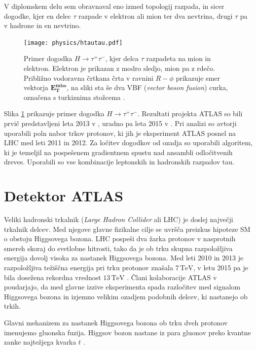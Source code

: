 \documentclass[11pt,a4paper,openany]{book}
\begin{document}
V diplomskem delu sem obravnaval eno izmed topologij razpada, in sicer dogodke, kjer en delec $\tau$ razpade v elektron ali mion ter dva nevtrina, drugi $\tau$ pa v hadrone in en nevtrino.

\begin{figure}[ht]
	\texttt{[image: physics/htautau.pdf]}
	
	\caption{Primer dogodka $H \rightarrow \tau^+\tau^-$, kjer delca $\tau$ razpadeta na mion in elektron. Elektron je prikazan z modro sledjo, mion pa z rdečo. Približno vodoravna črtkana črta v ravnini $R-\phi$ prikazuje smer vektorja $\mathbf{E_T^{miss}}$, na sliki sta še dva VBF (\textit{vector boson fusion}) curka, označena s turkiznima stožcema \cite{atlas2015htautau}.  }
	\label{htautau}
\end{figure}

Slika \ref{htautau} prikazuje primer dogodka $H \rightarrow \tau^+\tau^-$. Rezultati projekta ATLAS so bili prvič predstavljeni leta 2013 v \cite{atlas2013}, uradno pa leta 2015 v \cite{atlas2015htautau}. Pri analizi so avtorji uporabili poln nabor trkov protonov, ki jih je eksperiment ATLAS posnel na LHC med leti 2011 in 2012. Za ločitev dogodkov od ozadja so uporabili algoritem, ki je temeljil na pospešenem gradientnem spustu nad ansambli odločitvenih dreves. Uporabili so vse kombinacije leptonskih in hadronskih razpadov tau.

\section{Detektor ATLAS}
\label{sec:atlasdetector}
Veliki hadronski trkalnik (\textit{Large Hadron Collider} ali {LHC}) je doslej največji trkalnik delcev. Med njegove glavne fizikalne cilje se uvršča preizkus hipoteze SM o obstoju Higgsovega bozona. LHC pospeši dva žarka protonov v nasprotnih smereh skoraj do svetlobne hitrosti, tako da je ob trku skupna razpoložljiva energija dovolj visoka za nastanek Higgsovega bozona. Med leti 2010 in 2013 je razpoložljiva težiščna energija pri trku protonov znašala $7\,\text{TeV}$, v letu 2015 pa je bila dosežena rekordna vrednost $13\,\text{TeV}$ \cite{WikiLHC}. Člani kolaboracije ATLAS v \cite{AadScience2012} poudarjajo, da med glavne izzive eksperimenta spada razločitev med signalom Higgsovega bozona in izjemno velikim ozadjem podobnih delcev, ki nastanejo ob trkih.

Glavni mehanizem za nastanek Higgsovega bozona ob trku dveh protonov imenujemo gluonska fuzija. Higgsov bozon nastane iz para gluonov preko kvantne zanke najtežjega kvarka $t$ \cite{AadScience2012}. 
\end{document}
